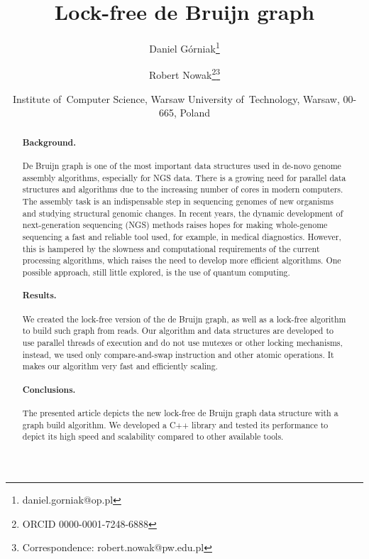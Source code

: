 \documentclass[12pt]{article}
\title{Lock-free de Bruijn graph}
\author{Daniel Górniak\footnote{daniel.gorniak@op.pl} \and Robert Nowak\footnote{ORCID 0000-0001-7248-6888}\footnote{Correspondence: robert.nowak@pw.edu.pl}}
\date{Institute of~Computer Science, Warsaw University of~Technology, Warsaw, 00-665, Poland}
\begin{document}
\maketitle

\begin{abstract} %
  \begin{minipage}{\textwidth}
  \paragraph{Background.} De Bruijn graph is one of the most important data structures used in de-novo genome assembly algorithms, especially for NGS data.
There is a growing need for parallel data structures and algorithms due to the increasing number of cores in modern computers.
The assembly task is an indispensable step in sequencing genomes of new organisms and studying structural genomic changes. In recent years, the dynamic development of next-generation sequencing (NGS) methods raises hopes for making whole-genome sequencing a fast and reliable tool used, for example, in medical diagnostics. However, this is hampered by the slowness and computational requirements of the current processing algorithms, which raises the need to develop more efficient algorithms. One possible approach, still little explored, is the use of quantum computing.

\paragraph{Results.} We created the lock-free version of the de Bruijn graph, as well as a lock-free algorithm to build such graph from reads.
Our algorithm and data structures are developed to use parallel threads of execution and do not use mutexes or other locking mechanisms,
instead, we used only compare-and-swap instruction and other atomic operations.
It makes our algorithm very fast and efficiently scaling.

\paragraph{Conclusions.} The presented article depicts the new lock-free de Bruijn graph data structure with a graph build algorithm.
We developed a C++ library and tested its performance to depict its high speed and scalability compared to other available tools.
  \end{minipage}
\end{abstract}
\end{document}
